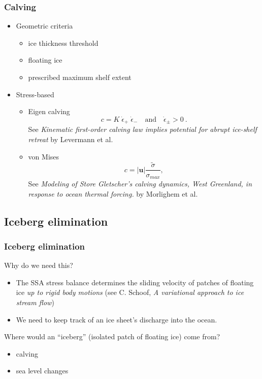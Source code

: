 \documentclass[hide notes,intlimits]{beamer}
\begin{document}
\begin{frame}
  \frametitle{Calving}

  \begin{itemize}
  \item Geometric criteria
    \begin{itemize}
    \item ice thickness threshold
    \item floating ice
    \item prescribed maximum shelf extent
    \end{itemize}
  \item Stress-based
    \begin{itemize}
    \item Eigen calving
      \begin{equation}
        \label{eq:7}
        c = K\; \dot{\epsilon}_{+}\; \dot{\epsilon}_{-}\quad\text{and}\quad\dot{\epsilon}_{\pm}>0\:.
      \end{equation}
      See \emph{Kinematic first-order calving law implies
      potential for abrupt ice-shelf retreat} by Levermann et al.
    \item von Mises
      \begin{equation}
        \label{eq:8}
        c = |\mathbf{u}| \frac{\tilde{\sigma}}{\sigma_{max}},
      \end{equation}
      See \emph{Modeling of Store Gletscher’s calving dynamics, West
        Greenland, in response to ocean thermal forcing.} by Morlighem
      et al.
    \end{itemize}
  \end{itemize}
\end{frame}


\subsection{Iceberg elimination}
\label{sec:iceberg-elimination}

\begin{frame}
  \frametitle{Iceberg elimination}

  Why do we need this?

  \begin{itemize}
  \item The SSA stress balance determines the sliding velocity of
    patches of floating ice \emph{up to rigid body motions} (see C.
    Schoof, \emph{A variational approach to ice stream flow})
  \item We need to keep track of an ice sheet's discharge into the
    ocean.
  \end{itemize}

  Where would an ``iceberg'' (isolated patch of floating ice) come
  from?
  \begin{itemize}
  \item calving
  \item sea level changes
  \end{itemize}
\end{frame}
\end{document}
